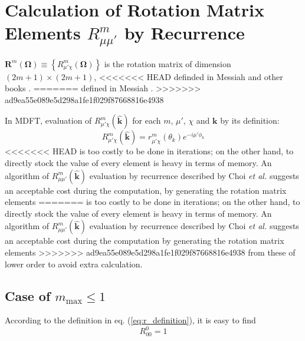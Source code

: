 
\chapter{Calculation of Rotation Matrix Elements $R_{\mu\mu'}^{m}$ by Recurrence\label{chpt:rotM-by-recurrence}}

$\mathbf{R}^{m}(\mathbf{\Omega})\equiv\left\{ R_{\mu'\chi}^{m}(\mathbf{\Omega})\right\} $
is the rotation matrix of dimension $\left(2m+1\right)\times\left(2m+1\right)$,
<<<<<<< HEAD
definded in Messiah and other books \citep{Edmonds,Gray-Gubbins,Messiah}.
=======
defined in Messiah \citep{Edmonds,Gray-Gubbins,Messiah}.
>>>>>>> ad9ea55e089e5d298a1fe1f029f87668816e4938

In MDFT, evaluation of $R_{\mu'\chi}^{m}(\hat{\mathbf{k}})$ for each
$m$, $\mu'$, $\chi$ and $\mathbf{k}$ by its definition:
\begin{equation}
R_{\mu'\chi}^{m}(\hat{\mathbf{k}})=r_{\mu'\chi}^{m}(\theta_{k})e^{-i\mu'\phi_{k}}\label{eq:r_definition}
\end{equation}
<<<<<<< HEAD
is too costly to be done in iterations; on the other hand, to directly
stock the value of every element is heavy in terms of memory. An algorithm
of $R_{\mu\mu'}^{m}(\hat{\mathbf{k}})$ evaluation by recurrence described
by Choi \textit{et al.} \citep{Choi_1999} suggests an acceptable
cost during the computation, by generating the rotation matrix elements
=======
is too costly to be done in iterations; on the other hand, to directly stock
the value of every element is heavy in terms of memory. An
algorithm of $R_{\mu\mu'}^{m}(\hat{\mathbf{k}})$ evaluation by recurrence
described by Choi \textit{et al.} \citep{Choi_1999} suggests an acceptable
cost during the computation by generating the rotation matrix elements
>>>>>>> ad9ea55e089e5d298a1fe1f029f87668816e4938
from these of lower order to avoid extra calculation.


\section{Case of $m_{\mathrm{max}}\leq1$}

According to the definition in eq. (\ref{eq:r_definition}), it is
easy to find
\begin{equation}
R_{00}^{0}=1
\end{equation}


